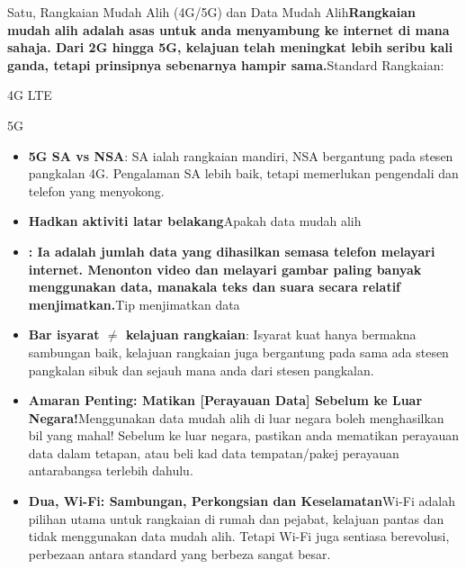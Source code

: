 Satu, Rangkaian Mudah Alih (4G/5G) dan Data Mudah Alih\textbf{Rangkaian mudah alih adalah asas untuk anda menyambung ke internet di mana sahaja. Dari 2G hingga 5G, kelajuan telah meningkat lebih seribu kali ganda, tetapi prinsipnya sebenarnya hampir sama.}Standard Rangkaian:

4G LTE


5G


\begin{itemize}
  \item \textbf{5G SA vs NSA}: SA ialah rangkaian mandiri, NSA bergantung pada stesen pangkalan 4G. Pengalaman SA lebih baik, tetapi memerlukan pengendali dan telefon yang menyokong.
  \item \textbf{Hadkan aktiviti latar belakang}Apakah data mudah alih
  \item \textbf{: Ia adalah jumlah data yang dihasilkan semasa telefon melayari internet. Menonton video dan melayari gambar paling banyak menggunakan data, manakala teks dan suara secara relatif menjimatkan.}Tip menjimatkan data
\end{itemize}


\begin{itemize}
  \item \textbf{Bar isyarat $\neq$ kelajuan rangkaian}: Isyarat kuat hanya bermakna sambungan baik, kelajuan rangkaian juga bergantung pada sama ada stesen pangkalan sibuk dan sejauh mana anda dari stesen pangkalan.
  \item \textbf{Amaran Penting: Matikan [Perayauan Data] Sebelum ke Luar Negara!}Menggunakan data mudah alih di luar negara boleh menghasilkan bil yang mahal! Sebelum ke luar negara, pastikan anda mematikan perayauan data dalam tetapan, atau beli kad data tempatan/pakej perayauan antarabangsa terlebih dahulu.
  \item \textbf{Dua, Wi-Fi: Sambungan, Perkongsian dan Keselamatan}Wi-Fi adalah pilihan utama untuk rangkaian di rumah dan pejabat, kelajuan pantas dan tidak menggunakan data mudah alih. Tetapi Wi-Fi juga sentiasa berevolusi, perbezaan antara standard yang berbeza sangat besar.
\end{itemize}

